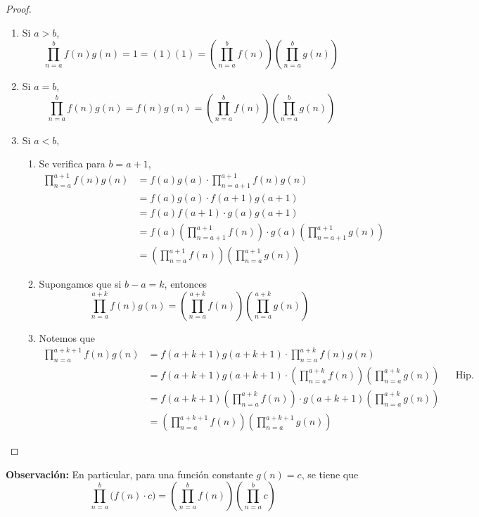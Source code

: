 \begin{enumerate}[label=\alph*)]
    \begin{proof}\leavevmode
      \begin{enumerate}[label=\Roman*)]
        \item Si $a>b$, \[\prod_{n=a}^{b} f(n) g(n) = 1 = (1)(1) = \left(\prod_{n=a}^{b} f(n)\right) \left(\prod_{n=a}^{b} g(n)\right)\]
        \item Si $a=b$, \[\prod_{n=a}^{b} f(n) g(n) = f(n)g(n) = \left(\prod_{n=a}^{b} f(n)\right) \left(\prod_{n=a}^{b} g(n)\right)\]
        \item Si $a<b$,
        \begin{enumerate}[label=\roman*)]
          \item Se verifica para $b=a+1$,
          \begin{align*}
            \prod_{n=a}^{a+1} f(n) g(n) &= f(a) g(a) \cdot \prod_{n=a+1}^{a+1} f(n) g(n)\\
            &= f(a) g(a) \cdot f(a+1) g(a+1)\\
            &= f(a)f(a+1) \cdot g(a)g(a+1)\\
            &= f(a) \left(\prod_{n=a+1}^{a+1} f(n)\right) \cdot g(a) \left(\prod_{n=a+1}^{a+1} g(n)\right)\\
            &= \left(\prod_{n=a}^{a+1} f(n)\right) \left(\prod_{n=a}^{a+1} g(n)\right)
          \end{align*}
          \item Supongamos que si $b-a=k$, entonces
          \[\prod_{n=a}^{a+k} f(n) g(n) = \left(\prod_{n=a}^{a+k} f(n)\right) \left(\prod_{n=a}^{a+k} g(n)\right)\]
          \item Notemos que
          \begin{align*}
            \prod_{n=a}^{a+k+1} f(n) g(n) &= f(a+k+1)g(a+k+1) \cdot \prod_{n=a}^{a+k} f(n) g(n)\\
            &= f(a+k+1)g(a+k+1) \cdot \left(\prod_{n=a}^{a+k} f(n)\right) \left(\prod_{n=a}^{a+k} g(n)\right) && \text{Hip. Ind.}\\
            &=f(a+k+1) \left(\prod_{n=a}^{a+k} f(n)\right)  \cdot g(a+k+1) \left(\prod_{n=a}^{a+k} g(n)\right)\\
            &= \left(\prod_{n=a}^{a+k+1} f(n)\right) \left(\prod_{n=a}^{a+k+1} g(n)\right)
          \end{align*}
        \end{enumerate}
      \end{enumerate}
    \end{proof}
    
    \textbf{Observación:} En particular, para una función constante $g(n)=c$, se tiene que \[\prod_{n=a}^{b} \big(f(n) \cdot c\big) = \left(\prod_{n=a}^{b} f(n)\right) \left(\prod_{n=a}^{b} c\right)\]
    

\end{enumerate}
